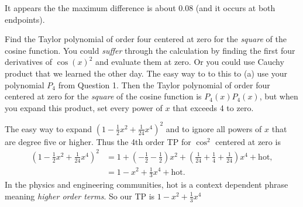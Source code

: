 \documentclass[12pt,fleqn]{exam}
\begin{document}
\begin{questions}
\begin{solution}
It appears the the maximum difference is about 0.08 (and it occurs at both endpoints).
\end{solution}

\newpage

\question[2] Find the Taylor polynomial of order four centered at zero for the \emph{square} of the cosine function.  You could \emph{suffer}
through the calculation by finding the first four derivatives of $\cos(x)^2$ and evaluate them at zero. Or you could use Cauchy product that we
learned the other day.  The easy way to to this to (a) use your polynomial $P_4$ from Question 1.  Then the Taylor polynomial of order four centered at zero for the \emph{square} of the cosine function
is $P_4(x) P_4(x)$, but when you expand this product, set every power of $x$ that exceeds 4 to zero.


 


\begin{solution}
The easy way to expand $(1 - \frac{1}{2} x^2 + \frac{1}{24} x^4)^2$ and to ignore all powers of $x$ that are degree five
or higher. Thus the 4th order TP for $\cos^2$ centered at zero is
\begin{align*}
   (1 - \frac{1}{2} x^2  + \frac{1}{24} x^4)^2 &= 1 + (-\frac{1}{2} - \frac{1}{2}) x^2 + (\frac{1}{24} + \frac{1}{4} + 
   \frac{1}{24}) x^4 + \text{hot}, \\
      &= 1 - x^2 +  \frac{1}{3} x^4 +  \text{hot}.
\end{align*}
In the physics and engineering communities,  $\text{hot}$ is a context dependent phrase meaning \emph{higher order terms}.
So our TP is $1 - x^2  + \frac{1}{3} x^4 $
\end{solution}

\end{questions}
\end{document}
